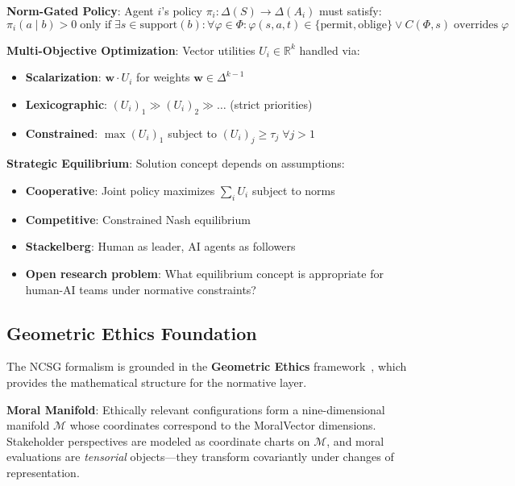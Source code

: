 \documentclass[conference]{IEEEtran}
\begin{document}
\textbf{Norm-Gated Policy}: Agent $i$'s policy $\pi_i: \Delta(S) \to \Delta(A_i)$ must satisfy:
\begin{equation}
\pi_i(a \mid b) > 0 \;\text{only if}\; \exists s \in \text{support}(b): \forall \varphi \in \Phi: \varphi(s, a, t) \in \{\text{permit}, \text{oblige}\} \lor C(\Phi, s) \;\text{overrides}\; \varphi
\end{equation}

\textbf{Multi-Objective Optimization}: Vector utilities $U_i \in \mathbb{R}^k$ handled via:
\begin{itemize}
\item \textbf{Scalarization}: $\mathbf{w} \cdot U_i$ for weights $\mathbf{w} \in \Delta^{k-1}$
\item \textbf{Lexicographic}: $(U_i)_1 \gg (U_i)_2 \gg \ldots$ (strict priorities)
\item \textbf{Constrained}: $\max (U_i)_1$ subject to $(U_i)_j \geq \tau_j\;\forall j > 1$
\end{itemize}

\textbf{Strategic Equilibrium}: Solution concept depends on assumptions:
\begin{itemize}
\item \textbf{Cooperative}: Joint policy maximizes $\sum_i U_i$ subject to norms
\item \textbf{Competitive}: Constrained Nash equilibrium
\item \textbf{Stackelberg}: Human as leader, AI agents as followers
\item \textbf{Open research problem}: What equilibrium concept is appropriate for human-AI teams under normative constraints?
\end{itemize}

\subsection{Geometric Ethics Foundation}

The NCSG formalism is grounded in the \textbf{Geometric Ethics} framework~\cite{bond2026ge}, which provides the mathematical structure for the normative layer.

\textbf{Moral Manifold}: Ethically relevant configurations form a nine-dimensional manifold $\mathcal{M}$ whose coordinates correspond to the MoralVector dimensions. Stakeholder perspectives are modeled as coordinate charts on $\mathcal{M}$, and moral evaluations are \emph{tensorial} objects---they transform covariantly under changes of representation.
\end{document}
